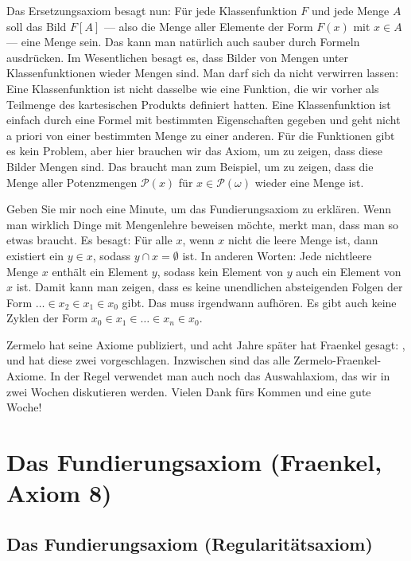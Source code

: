 \begin{spoken-clean}[01:21:39 - 01:24:03]
Das Ersetzungsaxiom besagt nun: Für jede Klassenfunktion $F$ und jede Menge $A$ soll das Bild $F[A]$ --- also die Menge aller Elemente der Form $F(x)$ mit $x \in A$ --- eine Menge sein. Das kann man natürlich auch sauber durch Formeln ausdrücken. Im Wesentlichen besagt es, dass Bilder von Mengen unter Klassenfunktionen wieder Mengen sind. Man darf sich da nicht verwirren lassen: Eine Klassenfunktion ist nicht dasselbe wie eine Funktion, die wir vorher als Teilmenge des kartesischen Produkts definiert hatten. Eine Klassenfunktion ist einfach durch eine Formel mit bestimmten Eigenschaften gegeben und geht nicht a priori von einer bestimmten Menge zu einer anderen. Für die  Funktionen gibt es kein Problem, aber hier brauchen wir das Axiom, um zu zeigen, dass diese Bilder Mengen sind. Das braucht man zum Beispiel, um zu zeigen, dass die Menge aller Potenzmengen $\mathcal{P}(x)$ für $x \in \mathcal{P}(\omega)$ wieder eine Menge ist.

Geben Sie mir noch eine Minute, um das Fundierungsaxiom zu erklären. Wenn man wirklich Dinge mit Mengenlehre beweisen möchte, merkt man, dass man so etwas braucht. Es besagt: Für alle $x$, wenn $x$ nicht die leere Menge ist, dann existiert ein $y \in x$, sodass $y \cap x = \emptyset$ ist. In anderen Worten: Jede nichtleere Menge $x$ enthält ein Element $y$, sodass kein Element von $y$ auch ein Element von $x$ ist. Damit kann man zeigen, dass es keine unendlichen absteigenden Folgen der Form $\dots \in x_2 \in x_1 \in x_0$ gibt. Das muss irgendwann aufhören. Es gibt auch keine Zyklen der Form $x_0 \in x_1 \in \dots \in x_n \in x_0$.

Zermelo hat seine Axiome publiziert, und acht Jahre später hat Fraenkel gesagt: , und hat diese zwei vorgeschlagen. Inzwischen sind das alle Zermelo-Fraenkel-Axiome. In der Regel verwendet man auch noch das Auswahlaxiom, das wir in zwei Wochen diskutieren werden. Vielen Dank fürs Kommen und eine gute Woche!
\end{spoken-clean}

\section{Das Fundierungsaxiom (Fraenkel, Axiom 8)}

\subsection{Das Fundierungsaxiom (Regularitätsaxiom)}

